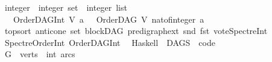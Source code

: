 \begin{isabellebody}
\ integer\ {\isasymRightarrow}\ {\isacharparenleft}{\kern0pt}integer\ set\ {\isasymtimes}\ integer\ list{\isacharparenright}{\kern0pt}{\isachardoublequoteclose}\ \isanewline
\ \ {\isachardoublequoteopen}\ OrderDAG{\isacharunderscore}{\kern0pt}Int\ V\ a\ {\isacharequal}{\kern0pt}\ \ {\isacharparenleft}{\kern0pt}OrderDAG\ V\ {\isacharparenleft}{\kern0pt}nat{\isacharunderscore}{\kern0pt}of{\isacharunderscore}{\kern0pt}integer\ a{\isacharparenright}{\kern0pt}{\isacharparenright}{\kern0pt}{\isachardoublequoteclose}\isanewline
\ \isanewline
\isanewline
{}\isamarkupfalse%
\ top{\isacharunderscore}{\kern0pt}sort\ anticone\ set\ blockDAG\ pre{\isacharunderscore}{\kern0pt}digraph{\isacharunderscore}{\kern0pt}ext\ snd\ fst\ vote{\isacharunderscore}{\kern0pt}Spectre{\isacharunderscore}{\kern0pt}Int\isanewline
\ SpectreOrder{\isacharunderscore}{\kern0pt}Int\ OrderDAG{\isacharunderscore}{\kern0pt}Int\isanewline
\ \ Haskell\ \ DAGS\ \ {\isachardoublequoteopen}code{\isacharslash}{\kern0pt}{\isachardoublequoteclose}\ \isanewline
\isanewline
{}\isamarkupfalse%
\ \isanewline
%
\isadelimproof
\ \ %
\endisadelimproof
%
\isatagproof
{}\isamarkupfalse%
\ {\isacharquery}{\kern0pt}G\ {\isacharequal}{\kern0pt}\ {\isachardoublequoteopen}{\isasymlparr}verts\ {\isacharequal}{\kern0pt}\ {\isacharbraceleft}{\kern0pt}{}{\isacharcolon}{\kern0pt}{\isacharcolon}{\kern0pt}int{\isacharcomma}{\kern0pt}{}{\isacharcomma}{\kern0pt}{}{\isacharcomma}{\kern0pt}{}{\isacharcomma}{\kern0pt}{}{\isacharcomma}{\kern0pt}{}{\isacharcomma}{\kern0pt}{}{\isacharcomma}{\kern0pt}{}{\isacharcomma}{\kern0pt}{}{\isacharcomma}{\kern0pt}{}{}{\isacharbraceright}{\kern0pt}{\isacharcomma}{\kern0pt}\ arcs\ {\isacharequal}{\kern0pt}\ {\isacharbraceleft}{\kern0pt}{\isacharparenleft}{\kern0pt}{}{\isacharcomma}{\kern0pt}{}{\isacharparenright}{\kern0pt}{\isacharcomma}{\kern0pt}{\isacharparenleft}{\kern0pt}{}{\isacharcomma}{\kern0pt}{}{\isacharparenright}{\kern0pt}{\isacharcomma}{\kern0pt}{\isacharparenleft}{\kern0pt}{}{\isacharcomma}{\kern0pt}{}{\isacharparenright}{\kern0pt}{\isacharcomma}{\kern0pt}\isanewline

\end{isabellebody}
